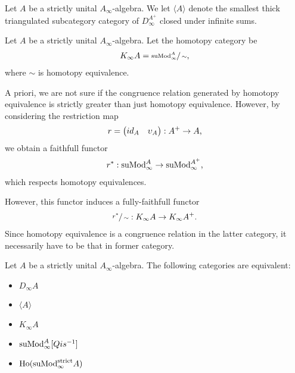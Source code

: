 \documentclass[../thesis.tex]{subfiles}
\begin{document}
            \begin{definition}
                Let $A$ be a strictly unital $A_\infty$-algebra. We let $\langle A \rangle$ denote the smallest thick triangulated subcategory category of $D_\infty^{A^+}$ closed under infinite sums. 
            \end{definition}

            \begin{definition}
                Let $A$ be a strictly unital $A_\infty$-algebra. Let the homotopy category be
                \begin{align*}
                    K_\infty A = \sfrac{\tt{suMod}_\infty^A}{\sim}\tt{,}
                \end{align*}
                where $\sim$ is homotopy equivalence.
            \end{definition}

            A priori, we are not sure if the congruence relation generated by homotopy equivalence is strictly greater than just homotopy equivalence. However, by considering the restriction map
            \begin{align*}
                r = \begin{pmatrix}
                    id_A & \upsilon_A
                \end{pmatrix} : A^+ \rightarrow A\tt{,} 
            \end{align*}
            we obtain a faithfull functor
            \begin{align*}
                r^* : \tt{suMod}_\infty^A \rightarrow \tt{suMod}_\infty^{A^+}\tt{,}
            \end{align*}
            which respects homotopy equivalences.

            However, this functor induces a fully-faithfull functor
            \begin{align}
                \sfrac{r^*}{\sim} : K_\infty A \rightarrow K_\infty A^+\tt{.}
            \end{align}
            Since homotopy equivalence is a congruence relation in the latter category, it necessarily have to be that in former category.

            \begin{thm}
                Let $A$ be a strictly unital $A_\infty$-algebra. The following categories are equivalent:
                \begin{itemize}
                    \item $D_\infty A$
                    \item $\langle A \rangle$
                    \item $K_\infty A$
                    \item $\tt{suMod}_\infty^A[Qis^{-1}]$
                    \item $\tt{Ho}(\tt{suMod}_\infty^{\tt{strict}}A)$
                \end{itemize}
            \end{thm}
\end{document}
